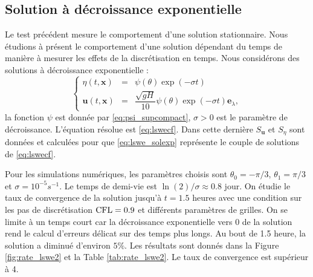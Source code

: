 \subsection{Solution à décroissance exponentielle}

Le test précédent mesure le comportement d'une solution stationnaire. Nous étudions à présent le comportement d'une solution dépendant du temps de manière à mesurer les effets de la discrétisation en temps. Nous considérons des solutions à décroissance exponentielle :
\begin{equation}
\left\lbrace
\begin{array}{rcl}
\eta(t,\mathbf{x}) & = & \psi(\theta) \exp \left( - \sigma t \right)\\
\mathbf{u}(t,\mathbf{x}) & = & \dfrac{\sqrt{gH}}{10} \psi(\theta) \exp \left( - \sigma t \right) \mathbf{e}_{\lambda},
\end{array}
\right.
\label{eq:lswe_solexp}
\end{equation}
la fonction $\psi$ est donnée par \eqref{eq:psi_supcompact}, $\sigma>0$ est le paramètre de décroissance. L'équation résolue est \eqref{eq:lswecf}. Dans cette dernière $S_{\mathbf{u}}$ et $S_{\eta}$ sont données et calculées pour que \eqref{eq:lswe_solexp} représente le couple de solutions de \eqref{eq:lswecf}.

Pour les simulations numériques, les paramètres choisis sont $\theta_0 = - \pi /3$, $\theta_1 = \pi /3$ et $\sigma = 10^{-5} \si{s}^{-1}$. Le temps de demi-vie est $\ln(2)/\sigma \approx 0.8$ jour. On étudie le taux de convergence de la solution jusqu'à $t=1.5$ heures avec une condition sur les pas de discrétisation $\text{CFL}=0.9$ et différents paramètres de grilles. 
On se limite à un temps court car la décroissance exponentielle vers 0 de la solution rend le calcul d'erreurs délicat sur des temps plus longs. Au bout de 1.5 heure, la solution a diminué d'environ $5\%$.
Les résultats sont donnés dans la Figure \ref{fig:rate_lswe2} et la Table \ref{tab:rate_lswe2}. Le taux de convergence est supérieur à 4.

